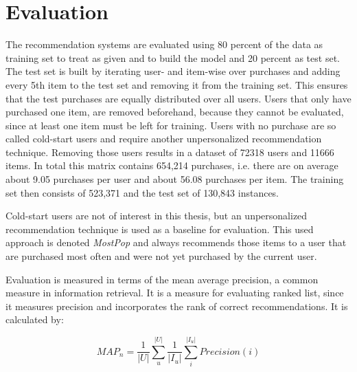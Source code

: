 \documentclass[10pt]{reportMaster}
\begin{document}


 \section{Evaluation}
\label{sec:eval}
The recommendation systems are evaluated using 80 percent of the data as training set to treat as given and to build the model and 20 percent as test set.
The test set is built by iterating user- and item-wise over purchases and adding every 5th item to the test set and removing it from the training set.
This ensures that the test purchases are equally distributed over all users.
Users that only have purchased one item, are removed beforehand, because they cannot be evaluated, since at least one item must be left for training.
Users with no purchase are so called cold-start users and require another unpersonalized recommendation technique.
Removing those users results in a dataset of 72318 users and 11666 items.
In total this matrix contains 654,214 purchases, i.e. there are on average about 9.05 purchases per user and about 56.08 purchases per item.
The training set then consists of 523,371 and the test set of 130,843 instances.

Cold-start users are not of interest in this thesis, but an unpersonalized recommendation technique is used as a baseline for evaluation.
This used approach is denoted \textit{MostPop} and always recommends those items to a user that are purchased most often and were not yet purchased by the current user.

Evaluation is measured in terms of the mean average precision, a common measure in information retrieval.
It is a measure for evaluating ranked list, since it measures precision and incorporates the rank of correct recommendations.
It is calculated by:

\begin{equation}
	MAP_n = \frac{1}{|U|} \sum_u^{|U|} \frac{1}{|I_u|}\sum_i^{|I_u|} Precision(i)
\end{equation}
\end{document}
